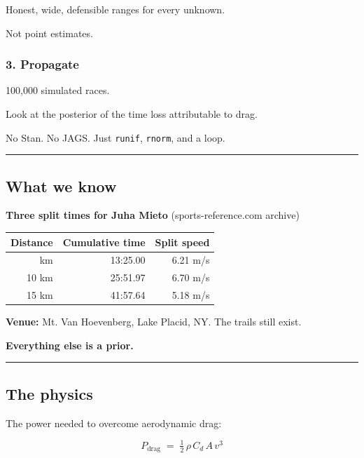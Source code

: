\documentclass[
  letterpaper,
  DIV=11,
  numbers=noendperiod]{scrartcl}
\begin{document}
Honest, wide, defensible ranges for every unknown.

Not point estimates.

\subsubsection{3. Propagate}\label{propagate}

100,000 simulated races.

Look at the posterior of the time loss attributable to drag.

No Stan. No JAGS. Just \texttt{runif}, \texttt{rnorm}, and a loop.

\begin{center}\rule{0.5\linewidth}{0.5pt}\end{center}

\subsection{What we know}\label{what-we-know}

\textbf{Three split times for Juha Mieto} (sports-reference.com archive)

\begin{longtable}[]{@{}rrr@{}}
\toprule\noalign{}
Distance & Cumulative time & Split speed \\
\midrule\noalign{}
\endhead
\bottomrule\noalign{}
\endlastfoot
5 km & 13:25.00 & 6.21 m/s \\
10 km & 25:51.97 & 6.70 m/s \\
15 km & 41:57.64 & 5.18 m/s \\
\end{longtable}

\textbf{Venue:} Mt. Van Hoevenberg, Lake Placid, NY. The trails still
exist.

\textbf{Everything else is a prior.}

\begin{center}\rule{0.5\linewidth}{0.5pt}\end{center}

\subsection{The physics}\label{the-physics}

The power needed to overcome aerodynamic drag:

\[
P_\text{drag} \;=\; \tfrac{1}{2}\,\rho\,C_d\,A\,v^{3}
\]
\end{document}
